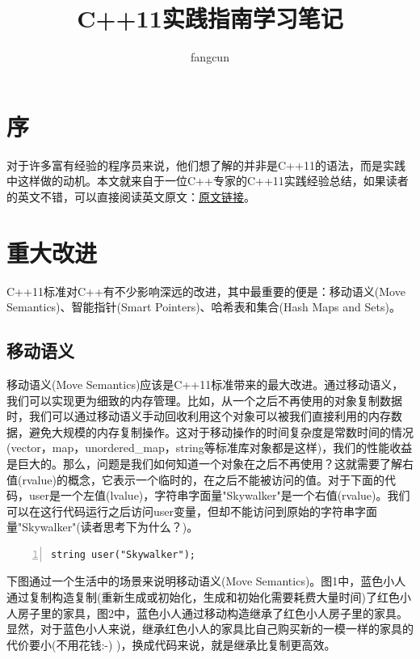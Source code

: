 \documentclass{ctexart}
\title{C++11实践指南学习笔记}
\author{fangcun}
\begin{document}
\maketitle
\newpage
\setcounter{tocdepth}{3}
\tableofcontents

\newpage
\section{序}

对于许多富有经验的程序员来说，他们想了解的并非是C++11的语法，而是实践中这样做的动机。本文就来自于一位C++专家的C++11实践经验总结，如果读者的英文不错，可以直接阅读英文原文：\href{https://stuartwheaton.com/blog/2020-06-14-c++11-guide/}{原文链接}。

\newpage
\section{重大改进}

C++11标准对C++有不少影响深远的改进，其中最重要的便是：移动语义(Move Semantics)、智能指针(Smart Pointers)、哈希表和集合(Hash Maps and Sets)。

\subsection{移动语义}

移动语义(Move Semantics)应该是C++11标准带来的最大改进。通过移动语义，我们可以实现更为细致的内存管理。比如，从一个之后不再使用的对象复制数据时，我们可以通过移动语义手动回收利用这个对象可以被我们直接利用的内存数据，避免大规模的内存复制操作。这对于移动操作的时间复杂度是常数时间的情况(vector，map，unordered\_map，string等标准库对象都是这样)，我们的性能收益是巨大的。那么，问题是我们如何知道一个对象在之后不再使用？这就需要了解右值(rvalue)的概念，它表示一个临时的，在之后不能被访问的值。对于下面的代码，user是一个左值(lvalue)，字符串字面量"Skywalker"是一个右值(rvalue)。我们可以在这行代码运行之后访问user变量，但却不能访问到原始的字符串字面量"Skywalker"(读者思考下为什么？)。

\begin{lstlisting}[language={[ANSI]C},keywordstyle=\color{blue!70},commentstyle=\color{red!50!green!50!blue!50},frame=shadowbox, rulesepcolor=\color{red!20!green!20!blue!20},basicstyle=\small,numbers=left, numberstyle=\tiny,breaklines=true]
string user("Skywalker");
\end{lstlisting}

下图通过一个生活中的场景来说明移动语义(Move Semantics)。图1中，蓝色小人通过复制构造复制(重新生成或初始化，生成和初始化需要耗费大量时间)了红色小人房子里的家具，图2中，蓝色小人通过移动构造继承了红色小人房子里的家具。显然，对于蓝色小人来说，继承红色小人的家具比自己购买新的一模一样的家具的代价要小(不用花钱:-) )，换成代码来说，就是继承比复制更高效。
\end{document}
